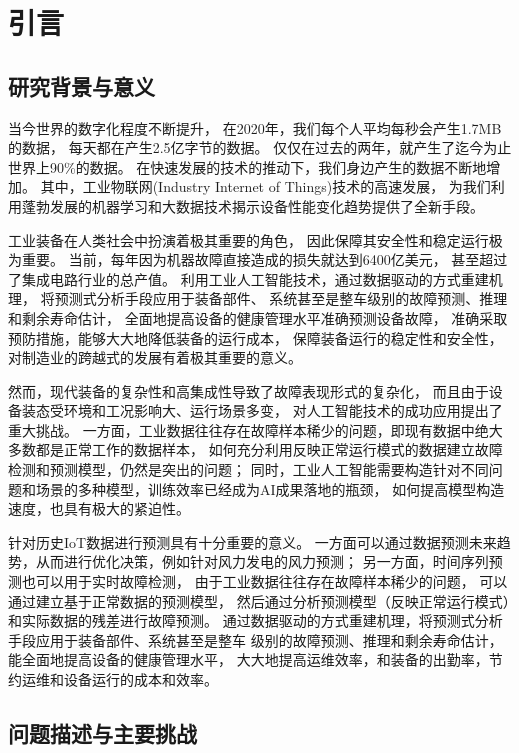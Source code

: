 ﻿%

\chapter{引言}\label{chapter1}

\section{研究背景与意义}
当今世界的数字化程度不断提升，
在2020年，我们每个人平均每秒会产生1.7MB的数据，
每天都在产生2.5亿字节的数据。
仅仅在过去的两年，就产生了迄今为止世界上90\%的数据\cite{siegel2013predictive}。
在快速发展的技术的推动下，我们身边产生的数据不断地增加。
其中，工业物联网(Industry Internet of Things)技术的高速发展，
为我们利用蓬勃发展的机器学习和大数据技术揭示设备性能变化趋势提供了全新手段。

工业装备在人类社会中扮演着极其重要的角色，
因此保障其安全性和稳定运行极为重要。
当前，每年因为机器故障直接造成的损失就达到6400亿美元\cite{isa}，
甚至超过了集成电路行业的总产值。
利用工业人工智能技术，通过数据驱动的方式重建机理，
将预测式分析手段应用于装备部件、
系统甚至是整车级别的故障预测、推理和剩余寿命估计，
全面地提高设备的健康管理水平准确预测设备故障，
准确采取预防措施，能够大大地降低装备的运行成本，
保障装备运行的稳定性和安全性，
对制造业的跨越式的发展有着极其重要的意义。


然而，现代装备的复杂性和高集成性导致了故障表现形式的复杂化，
而且由于设备装态受环境和工况影响大、运行场景多变，
对人工智能技术的成功应用提出了重大挑战。
一方面，工业数据往往存在故障样本稀少的问题，即现有数据中绝大多数都是正常工作的数据样本，
如何充分利用反映正常运行模式的数据建立故障检测和预测模型，仍然是突出的问题；
同时，工业人工智能需要构造针对不同问题和场景的多种模型，训练效率已经成为AI成果落地的瓶颈，
如何提高模型构造速度，也具有极大的紧迫性。


针对历史IoT数据进行预测具有十分重要的意义。
一方面可以通过数据预测未来趋势，从而进行优化决策，例如针对风力发电的风力预测；
另一方面，时间序列预测也可以用于实时故障检测，
由于工业数据往往存在故障样本稀少的问题，
可以通过建立基于正常数据的预测模型，
然后通过分析预测模型（反映正常运行模式）和实际数据的残差进行故障预测。
通过数据驱动的方式重建机理，将预测式分析手段应用于装备部件、系统甚至是整车
级别的故障预测、推理和剩余寿命估计，能全面地提高设备的健康管理水平，
大大地提高运维效率，和装备的出勤率，节约运维和设备运行的成本和效率。

\section{问题描述与主要挑战}
